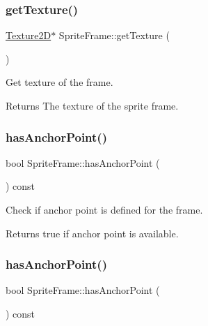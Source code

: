 \subsubsection{\texorpdfstring{get\+Texture()}{getTexture()}\hspace{0.1cm}{\footnotesize\ttfamily [2/2]}}
{\footnotesize\ttfamily \hyperlink{classTexture2D}{Texture2D}$\ast$ Sprite\+Frame\+::get\+Texture (\begin{DoxyParamCaption}{ }\end{DoxyParamCaption})}

Get texture of the frame.

\begin{DoxyReturn}{Returns}
The texture of the sprite frame. 
\end{DoxyReturn}
\mbox{\label{classSpriteFrame_acd8ff32e01d3692e36fb98b772c583e6}} 
\subsubsection{\texorpdfstring{has\+Anchor\+Point()}{hasAnchorPoint()}\hspace{0.1cm}{\footnotesize\ttfamily [1/2]}}
{\footnotesize\ttfamily bool Sprite\+Frame\+::has\+Anchor\+Point (\begin{DoxyParamCaption}{ }\end{DoxyParamCaption}) const}

Check if anchor point is defined for the frame.

\begin{DoxyReturn}{Returns}
true if anchor point is available. 
\end{DoxyReturn}
\mbox{\label{classSpriteFrame_acd8ff32e01d3692e36fb98b772c583e6}} 
\subsubsection{\texorpdfstring{has\+Anchor\+Point()}{hasAnchorPoint()}\hspace{0.1cm}{\footnotesize\ttfamily [2/2]}}
{\footnotesize\ttfamily bool Sprite\+Frame\+::has\+Anchor\+Point (\begin{DoxyParamCaption}{ }\end{DoxyParamCaption}) const}

